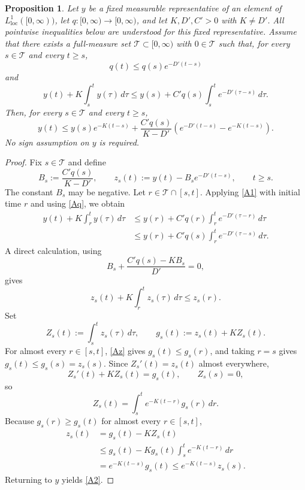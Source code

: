 \documentclass[11pt,reqno]{amsart}
\theoremstyle{plain}
\newtheorem{proposition}[thm]{Proposition}
\numberwithin{equation}{section}
\begin{document}
\begin{proposition}\label{AppendixA}
Let {$y$ be a fixed measurable representative of an
element of \(L^1_{\mathrm{loc}}([0,\infty))\)}, let
$q:[0,\infty)\to[0,\infty)$, and let $K,D',C'>0$ with $K\neq D'$.
{All pointwise inequalities below are understood for this
fixed representative.} Assume that there exists a full-measure set $\mathcal T\subset[0,\infty)$ with $0\in\mathcal T$ such that, for every $s\in\mathcal T$ and every $t\ge s$,
\begin{equation}\label{Aq}
q(t)\le q(s)e^{-D'(t-s)}
\end{equation}
and
\begin{equation}\label{A1}
y(t)+K\int_s^t y(\tau)\,d\tau
\le y(s)+C'q(s)\int_s^t e^{-D'(\tau-s)}\,d\tau.
\end{equation}
Then, for every $s\in\mathcal T$ and every $t\ge s$,
\begin{equation}\label{A2}
y(t)\le y(s)e^{-K(t-s)}+\frac{C'q(s)}{K-D'}\left(e^{-D'(t-s)}-e^{-K(t-s)}\right).
\end{equation}
No sign assumption on $y$ is required.
\end{proposition}

\begin{proof}
Fix $s\in\mathcal T$ and define
\[
B_s:=\frac{C'q(s)}{K-D'},
\qquad
z_s(t):=y(t)-B_se^{-D'(t-s)},
\qquad t\ge s.
\]
The constant $B_s$ may be negative. Let $r\in\mathcal T\cap[s,t]$. Applying \eqref{A1} with initial time $r$ and using \eqref{Aq}, we obtain
\[
\begin{aligned}
y(t)+K\int_r^t y(\tau)\,d\tau
&\le y(r)+C'q(r)\int_r^t e^{-D'(\tau-r)}\,d\tau\\
&\le y(r)+C'q(s)\int_r^t e^{-D'(\tau-s)}\,d\tau.
\end{aligned}
\]
A direct calculation, using
\[
B_s+\frac{C'q(s)-KB_s}{D'}=0,
\]
gives
\begin{equation}\label{Az}
z_s(t)+K\int_r^t z_s(\tau)\,d\tau\le z_s(r).
\end{equation}
Set
\[
Z_s(t):=\int_s^t z_s(\tau)\,d\tau,
\qquad
g_s(t):=z_s(t)+KZ_s(t).
\]
For almost every $r\in[s,t]$, \eqref{Az} gives $g_s(t)\le g_s(r)$, and taking $r=s$ gives $g_s(t)\le g_s(s)=z_s(s)$. Since $Z_s'(t)=z_s(t)$ almost everywhere,
\[
Z_s'(t)+KZ_s(t)=g_s(t),
\qquad Z_s(s)=0,
\]
so
\[
Z_s(t)=\int_s^t e^{-K(t-r)}g_s(r)\,dr.
\]
Because $g_s(r)\ge g_s(t)$ for almost every $r\in[s,t]$,
\[
\begin{aligned}
z_s(t)
&=g_s(t)-KZ_s(t)\\
&\le g_s(t)-Kg_s(t)\int_s^t e^{-K(t-r)}\,dr\\
&=e^{-K(t-s)}g_s(t)
\le e^{-K(t-s)}z_s(s).
\end{aligned}
\]
Returning to $y$ yields \eqref{A2}.
\end{proof}
\end{document}
